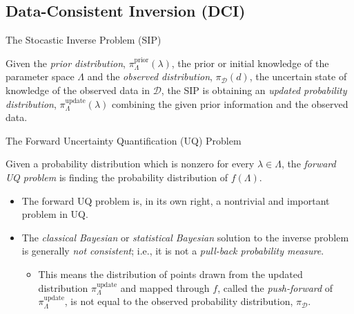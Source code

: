 \documentclass[11pt]{beamer}
\begin{document}
\subsection{Data-Consistent Inversion (DCI)}

\begin{frame}

\begin{block}{The Stocastic Inverse Problem (SIP) \footnotemark[1]\footnotemark[2]\footnotemark[3]}
	
Given the \emph{prior distribution}, $\pi_\Lambda^\text{prior}(\lambda)$, the prior or initial knowledge of the parameter space $\Lambda$ and the \emph{observed distribution}, $\pi_\mathcal{D}(d)$, the uncertain state of knowledge of the observed data in $\mathcal{D}$, the SIP is obtaining an \emph{updated probability distribution}, $\pi_\Lambda^\text{update}(\lambda)$ combining the given prior information and the observed data.

\end{block}


	
\end{frame}


\begin{frame}

\begin{block}{The Forward Uncertainty Quantification (UQ) Problem}

Given a probability distribution which is nonzero for every $\lambda \in \Lambda$, the \emph{forward UQ problem} is finding the probability distribution of $f(\Lambda)$. 


\end{block}


\begin{itemize}

\item The forward UQ problem is, in its own right, a nontrivial and important problem in UQ.

\item The \textit{classical Bayesian} or \textit{statistical Bayesian} solution to the inverse problem is generally {\em not consistent};
i.e., it is not a \textit{pull-back probability measure}. 


\begin{itemize}

	\item This means the distribution of points drawn from the updated distribution $\pi_\Lambda^\text{update}$ and mapped through $f$, called the \textit{push-forward} of $\pi_\Lambda^\text{update}$, is not equal to the observed probability distribution, $\pi_\mathcal{D}$. 

\end{itemize}

\end{itemize}

\end{frame}
\end{document}
